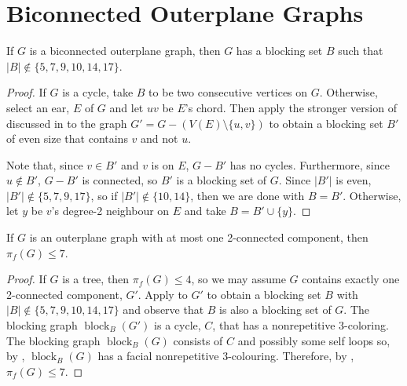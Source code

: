 \documentclass{patmorin}
\DeclareMathOperator{\block}{block}
\begin{document}



\appendix
\section{Biconnected Outerplane Graphs}

\begin{lem}
  If $G$ is a biconnected outerplane graph, then $G$ has a blocking set $B$
  such that $|B|\not\in\{5,7,9,10,14,17\}$.
\end{lem}

\begin{proof}
  If $G$ is a cycle, take $B$ to be two consecutive vertices on $G$.
  Otherwise, select an ear, $E$ of $G$ and let $uv$ be $E$'s chord.
  Then apply the stronger version of  discussed in
   to the graph $G'=G-(V(E)\setminus\{u,v\})$ to obtain a
  blocking set $B'$ of even size that contains $v$ and not $u$.

  Note that, since $v\in B'$ and $v$ is on $E$,  $G-B'$ has no cycles.
  Furthermore, since $u\not\in B'$, $G-B'$ is connected, so $B'$
  is a blocking set of $G$.  Since $|B'|$ is even, 
  $|B'|\not\in\{5,7,9,17\}$, so if $|B'|\not\in\{10, 14\}$, then we are
  done with $B=B'$. Otherwise, let $y$ be $v$'s degree-2 neighbour on $E$
  and take $B=B'\cup\{y\}$.
\end{proof}

\begin{cor}
  If $G$ is an outerplane graph with at most one 2-connected component, 
  then $\pi_f(G)\le 7$.
\end{cor}

\begin{proof}
  If $G$ is a tree, then $\pi_f(G)\le 4$, so we may assume $G$ contains
  exactly one 2-connected component, $G'$.  Apply  to
  $G'$ to obtain a blocking set $B$ with $|B|\not\in\{5,7,9,10,14,17\}$
  and observe that $B$ is also a blocking set of $G$.  The blocking graph
  $\block_B(G')$ is a cycle, $C$, that has a nonrepetitive 3-coloring.
  The blocking graph $\block_B(G)$ consists of $C$ and possibly some
  self loops so, by , $\block_B(G)$ has a facial
  nonrepetitive 3-colouring.  Therefore, by ,
  $\pi_f(G)\le 7$.
\end{proof}
\end{document}
